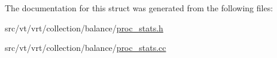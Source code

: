 The documentation for this struct was generated from the following files\+:\begin{DoxyCompactItemize}
\item 
src/vt/vrt/collection/balance/\hyperlink{proc__stats_8h}{proc\+\_\+stats.\+h}\item 
src/vt/vrt/collection/balance/\hyperlink{proc__stats_8cc}{proc\+\_\+stats.\+cc}\end{DoxyCompactItemize}
